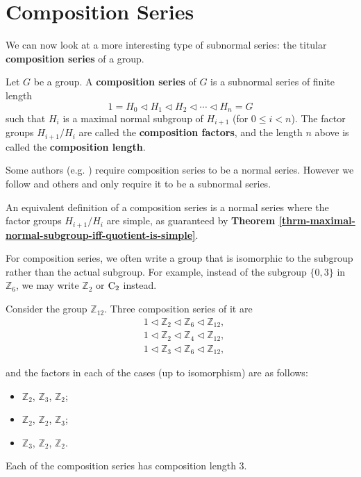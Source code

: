\section{Composition Series}
We can now look at a more interesting type of subnormal series: the titular \textbf{composition series} of a group.
\begin{definition}
    Let $G$ be a group. A \textbf{composition series} of $G$ is a subnormal series of finite length
    \[
        1 = H_0 \lhd H_1 \lhd H_2 \lhd \cdots \lhd H_n = G  
    \]
    such that $H_i$ is a maximal normal subgroup of $H_{i+1}$ (for $0 \leq i < n$). The factor groups $H_{i+1}/H_i$ are called the \textbf{composition factors}, and the length $n$ above is called the \textbf{composition length}.
\end{definition}
\begin{remark}
    Some authors (e.g. \cite{cohn_1982, clark_1984, proofwiki_compositionseriesdefinition}) require composition series to be a normal series. However we follow \cite{hungerford_1980, humphreys_1996, milne_2021} and others and only require it to be a subnormal series.
\end{remark}
\begin{remark}
    An equivalent definition of a composition series is a normal series where the factor groups $H_{i+1}/H_i$ are simple, as guaranteed by \textbf{Theorem \ref{thrm-maximal-normal-subgroup-iff-quotient-is-simple}}.
\end{remark}
\begin{remark}
    For composition series, we often write a group that is isomorphic to the subgroup rather than the actual subgroup. For example, instead of the subgroup $\{0, 3\}$ in $\mathbb{Z}_6$, we may write $\mathbb{Z}_2$ or $\mathrm{C}_{2}$ instead.
\end{remark}

\begin{example}
    Consider the group $\mathbb{Z}_{12}$. Three composition series of it are
    \begin{align*}
        &1 \lhd \mathbb{Z}_2 \lhd \mathbb{Z}_6 \lhd \mathbb{Z}_{12},\\
        &1 \lhd \mathbb{Z}_2 \lhd \mathbb{Z}_4 \lhd \mathbb{Z}_{12},\\
        &1 \lhd \mathbb{Z}_3 \lhd \mathbb{Z}_6 \lhd \mathbb{Z}_{12},
    \end{align*}
    
    and the factors in each of the cases (up to isomorphism) are as follows:
    \begin{itemize}
        \item $\mathbb{Z}_2$, $\mathbb{Z}_3$, $\mathbb{Z}_2$;
        \item $\mathbb{Z}_2$, $\mathbb{Z}_2$, $\mathbb{Z}_3$;
        \item $\mathbb{Z}_3$, $\mathbb{Z}_2$, $\mathbb{Z}_2$.
    \end{itemize}
    Each of the composition series has composition length 3.
\end{example}

